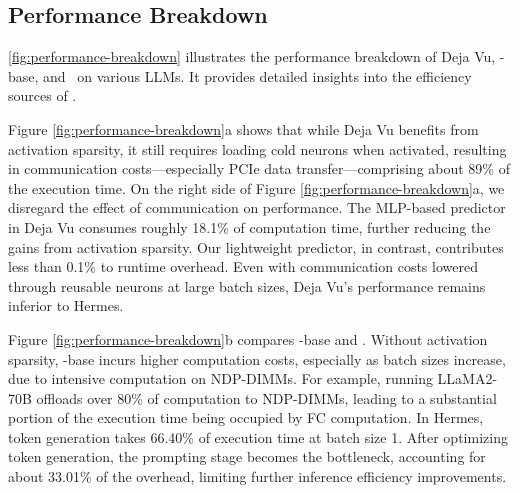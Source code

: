 \subsection{Performance Breakdown}\label{sec:breakdown}


\fig \ref{fig:performance-breakdown} illustrates the performance breakdown of Deja Vu, \name-base, and \name~on various LLMs. It provides detailed insights into the efficiency sources of \name.

Figure \ref{fig:performance-breakdown}a shows that while Deja Vu benefits from activation sparsity, it still requires loading cold neurons when activated, resulting in communication costs—especially PCIe data transfer—comprising about 89\% of the execution time. On the right side of Figure \ref{fig:performance-breakdown}a, we disregard the effect of communication on performance. The MLP-based predictor in Deja Vu consumes roughly 18.1\% of computation time, further reducing the gains from activation sparsity. Our lightweight predictor, in contrast, contributes less than 0.1\% to runtime overhead. Even with communication costs lowered through reusable neurons at large batch sizes, Deja Vu's performance remains inferior to Hermes.

Figure \ref{fig:performance-breakdown}b compares \name-base and \name. Without activation sparsity, \name-base incurs higher computation costs, especially as batch sizes increase, due to intensive computation on NDP-DIMMs. For example, running LLaMA2-70B offloads over 80\% of computation to NDP-DIMMs, leading to a substantial portion of the execution time being occupied by FC computation. In Hermes, token generation takes 66.40\% of execution time at batch size 1. After optimizing token generation, the prompting stage becomes the bottleneck, accounting for about 33.01\% of the overhead, limiting further inference efficiency improvements.



